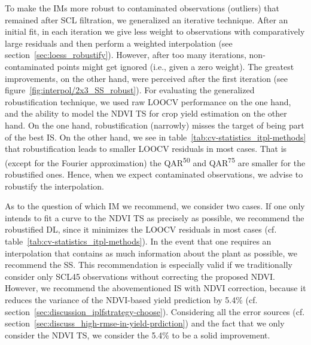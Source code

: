     To make the {{IM}}s more robust to contaminated observations (outliers) that remained after SCL filtration, we generalized an iterative technique. After an initial fit, in each iteration we give less weight to observations with comparatively large residuals and then perform a weighted interpolation (see section~\ref{sec:loess_robustify}). However, after too many iterations, non-contaminated points might get ignored (i.e., given a zero weight). The greatest improvements, on the other hand, were perceived after the first iteration (see figure~\ref{fig:interpol/2x3_SS_robust}). 
    For evaluating the generalized robustification technique, we used raw LOOCV performance on the one hand, and the ability to model the NDVI TS for crop yield estimation on the other hand.
    On the one hand, robustification (narrowly) misses the target of being part of the best {{IS}}. On the other hand, we see in table~\ref{tab:cv-statistics_itpl-methods} that robustification leads to smaller LOOCV residuals in most cases. That is (except for the Fourier approximation) the QAR\textsuperscript{50} and QAR\textsuperscript{75} are smaller for the robustified ones. Hence, when we expect contaminated observations, we advise to robustify the interpolation. 

As to the question of which {{IM}} we recommend, we consider two cases. If one only intends to fit a curve to the NDVI TS as precisely as possible, we recommend the robustified DL, since it minimizes the LOOCV residuals in most cases (cf. table~\ref{tab:cv-statistics_itpl-methods}). In the event that one requires an interpolation that contains as much information about the plant as possible, we recommend the SS. This recommendation is especially valid if we traditionally consider only SCL45 observations without correcting the proposed NDVI. However, we recommend the abovementioned {{IS}} with NDVI correction, because it reduces the variance of the NDVI-based yield prediction by 5.4\% (cf. section~\ref{sec:discussion_iplfstrategy-choose}). Considering all the error sources (cf. section~\ref{sec:discuss_high-rmse-in-yield-prdiction}) and the fact that we only consider the NDVI {TS}, we consider the 5.4\% to be a solid improvement.%



